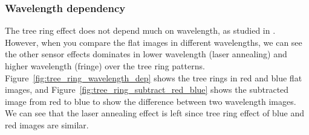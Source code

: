 \subsubsection{Wavelength dependency}
The tree ring effect does not depend much on wavelength, as studied in \citep{2017Jinst..12C05015,2020JATIS...6a1005P}. However, when you compare the flat images in different wavelengths, we can see the other sensor effects dominates in lower wavelength (laser annealing) and higher wavelength (fringe) over the tree ring patterns. Figure~\ref{fig:tree_ring_wavelength_dep} shows the tree rings in red and blue flat images, and Figure~\ref{fig:tree_ring_subtract_red_blue} shows the subtracted image from red to blue to show the difference between two wavelength images. We can see that the laser annealing effect is left since tree ring effect of blue and red images are similar. 

